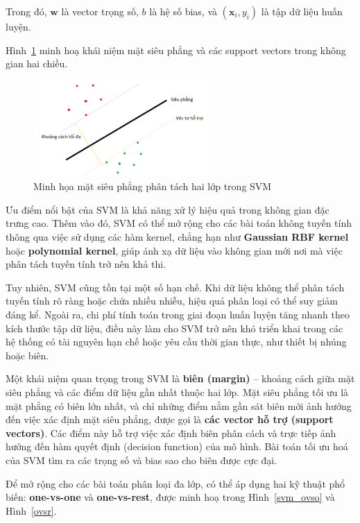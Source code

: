 Trong đó, $\mathbf{w}$ là vector trọng số, $b$ là hệ số bias, và $(\mathbf{x}_i, y_i)$ là tập dữ liệu huấn luyện.

Hình~\ref{svm} minh hoạ khái niệm mặt siêu phẳng và các support vectors trong không gian hai chiều.

\begin{figure}[htbp]
    \centering
    \includegraphics[width=0.6\textwidth]{images/svm.png}
    \caption{Minh họa mặt siêu phẳng phân tách hai lớp trong SVM}
    \label{svm}
\end{figure}
Ưu điểm nổi bật của SVM là khả năng xử lý hiệu quả trong không gian 
đặc trưng cao. Thêm vào đó, SVM có thể mở rộng cho các bài toán 
không tuyến tính thông qua việc sử dụng các hàm kernel, chẳng hạn như 
\textbf{Gaussian RBF kernel} hoặc \textbf{polynomial kernel}, 
giúp ánh xạ dữ liệu vào không gian mới nơi mà việc phân tách tuyến tính 
trở nên khả thi.

Tuy nhiên, SVM cũng tồn tại một số hạn chế. Khi dữ liệu không thể 
phân tách tuyến tính rõ ràng hoặc chứa nhiều nhiễu, hiệu quả phân loại 
có thể suy giảm đáng kể. Ngoài ra, chi phí tính toán trong giai 
đoạn huấn luyện tăng nhanh theo kích thước tập dữ liệu, điều này làm 
cho SVM trở nên khó triển khai trong các hệ thống có tài nguyên hạn 
chế hoặc yêu cầu thời gian thực, như thiết bị nhúng hoặc biên.

Một khái niệm quan trọng trong SVM là \textbf{biên (margin)} – khoảng 
cách giữa mặt siêu phẳng và các điểm dữ liệu gần nhất thuộc hai lớp. 
Mặt siêu phẳng tối ưu là mặt phẳng có biên lớn nhất, và chỉ những điểm 
nằm gần sát biên mới ảnh hưởng đến việc xác định mặt siêu phẳng, 
được gọi là \textbf{các vector hỗ trợ (support vectors)}. Các điểm này 
hỗ trợ việc xác định biên phân cách và trực tiếp ảnh hưởng đến hàm 
quyết định (decision function) của mô hình. Bài toán tối ưu hoá của 
SVM tìm ra các trọng số và bias sao cho biên được cực đại.

Để mở rộng cho các bài toán phân loại đa lớp, có thể áp dụng hai kỹ 
thuật phổ biến: \textbf{one-vs-one} và \textbf{one-vs-rest}, được minh 
hoạ trong Hình~\ref{svm_ovso} và Hình~\ref{ovsr}.

